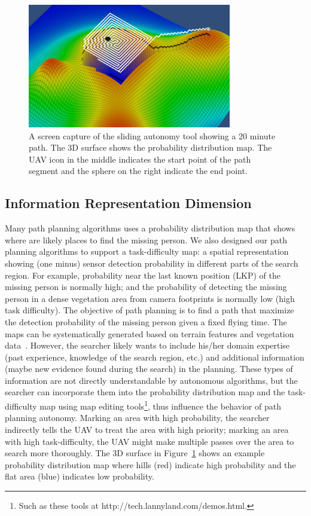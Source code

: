 \documentclass[journal]{IEEEtran}
\begin{document}
\begin{figure}
\centering
\includegraphics[width=3.5in]{Dimensions.JPG}
\caption{A screen capture of the sliding autonomy tool showing a 20 minute path. The 3D surface shows the probability distribution map. The UAV icon in the middle indicates the start point of the path segment and the sphere on the right indicate the end point.}
\label{dimensions}
\end{figure}

\subsection{Information Representation Dimension}

Many path planning algorithms uses a probability distribution map that shows where are likely places to find the missing person. We also designed our path planning algorithms to support a task-difficulty map: a spatial representation showing (one minus) sensor detection probability in different parts of the search region. For example, probability near the last known position (LKP) of the missing person is normally high; and the probability of detecting the missing person in a dense vegetation area from camera footprints is normally low (high task difficulty). The objective of path planning is to find a path that maximize the detection probability of the missing person given a fixed flying time. The maps can be systematically generated based on terrain features and vegetation data~\cite{Lin2010Bayesian, Lin2014Hierarchical}. However, the searcher likely wants to include his/her domain expertise (past experience, knowledge of the search region, etc.) and additional information (maybe new evidence found during the search) in the planning. These types of information are not directly understandable by autonomous algorithms, but the searcher can incorporate them into the probability distribution map and the task-difficulty map using map editing tools\footnote{Such as these tools at http://tech.lannyland.com/demos.html.}, thus influence the behavior of path planning autonomy. Marking an area with high probability, the searcher indirectly tells the UAV to treat the area with high priority; marking an area with high task-difficulty, the UAV might make multiple passes over the area to search more thoroughly. The 3D surface in Figure~\ref{dimensions} shows an example probability distribution map where hills (red) indicate high probability and the flat area (blue) indicates low probability.
\end{document}
